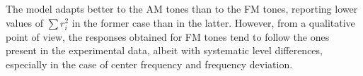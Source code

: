 \documentclass[../main.tex]{subfiles}
\begin{document}
\begin{modelchapter}

The model adapts better to the AM tones than to the FM tones, reporting lower
values of $\sum r_i^2$ in the former case than in the latter. However, from a
qualitative point of view, the responses obtained for FM tones tend to follow
the ones present in the experimental data, albeit with systematic level
differences, especially in the case of center frequency and frequency deviation.

\end{modelchapter}
\end{document}
